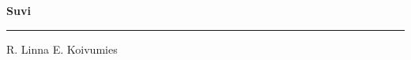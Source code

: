 \documentclass[10pt]{book}
\begin{document}
{
  \samepage
  \raggedbottom
  \raggedright
  \sloppy


  \vspace{0.2in}

  \noindent\begin{minipage}{.1\textwidth}
    \hfill\vspace{0.1in}
  \end{minipage}%
  \noindent\begin{minipage}{.8\textwidth}
    \centering
    \bfseries
    \large Suvi
  \end{minipage}%
  \noindent\begin{minipage}{.1\textwidth}
      \hfill\vspace{0.1in}
  \end{minipage}

  \nopagebreak[4]
  \vspace{0.1in}
  \nopagebreak[4]
  \hrule height 0.05ex
  \nopagebreak[4]
  \vspace{-0.05in}

  {\footnotesize R. Linna \hfill E. Koivumies }\\
  \vspace{0.01in}



}
\end{document}
